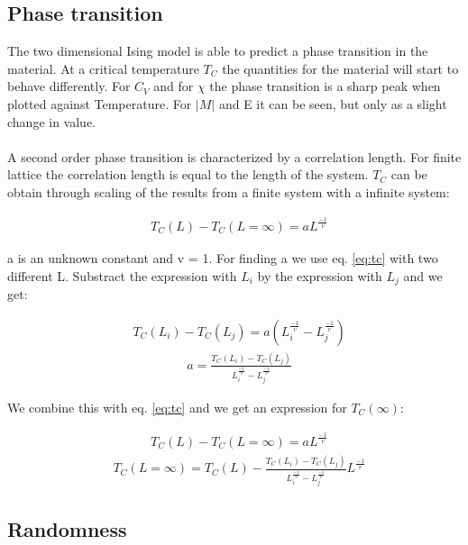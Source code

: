 \subsection{Phase transition}

The two dimensional Ising model is able to predict a phase transition in the material. At a critical temperature $T_C$ the quantities for the material will start to behave differently. For $C_V$ and for $\chi$ the phase transition is a sharp peak when plotted against Temperature. For $|M|$ and E it can be seen, but only as a slight change in value. 
\\
\\
A second order phase transition is characterized by a correlation length. For finite lattice the correlation length is equal to the length of the system. $T_C$ can be obtain through scaling of the results from a finite system with a infinite system:

\begin{align}
    &T_C (L) - T_C (L=\infty) = a L^{\frac{-1}{v}}
    \label{eq:tc}
\end{align}

a is an unknown constant and v = 1. For finding a we use eq. \ref{eq:tc} with two different L. Substract the expression with $L_i$ by the expression with $L_j$ and we get: 

\begin{align*}
    &T_C (L_i) - T_C (L_j) = a 
    \left(
    L_i^{\frac{-1}{v}}-L_j^{\frac{-1}{v}}
    \right)
\end{align*}
\begin{align}
    &a = 
    \frac{T_C (L_i) - T_C (L_j)} 
    {
    L_i^{\frac{-1}{v}}-L_j^{\frac{-1}{v}}
    } \label{eq:find-a}
\end{align}

We combine this with eq. \ref{eq:tc} and we get an expression for $T_C(\infty)$:

\begin{align*}
    &T_C (L) - T_C (L=\infty) = a L^{\frac{-1}{v}}
\end{align*}
\begin{align}
    &T_C (L=\infty) = T_C (L) -  \frac{T_C (L_i) - T_C (L_j)} 
    {
    L_i^{\frac{-1}{v}}-L_j^{\frac{-1}{v}}
    } \label{eq:find-a}
     L^{\frac{-1}{v}}
\end{align}








\subsection{Randomness}











